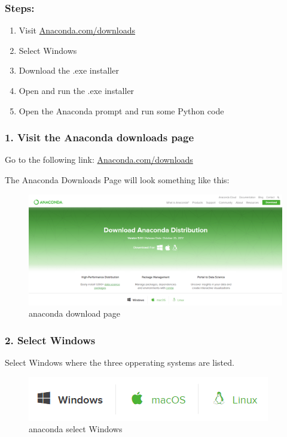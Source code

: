 \documentclass{book}
\makeatletter
\def\maxwidth{\ifdim\Gin@nat@width>\linewidth\linewidth
    \else\Gin@nat@width\fi}
\let\Oldincludegraphics\includegraphics
\renewcommand{\includegraphics}[1]{\Oldincludegraphics[width=.8\maxwidth]{#1}}
\makeatother
\begin{document}
\subsubsection{Steps:}\label{steps}

\begin{enumerate}
\def\labelenumi{\arabic{enumi}.}
\item
  Visit
  \href{https://www.anaconda.com/download/}{Anaconda.com/downloads}
\item
  Select Windows
\item
  Download the .exe installer
\item
  Open and run the .exe installer
\item
  Open the Anaconda prompt and run some Python code
\end{enumerate}

    \subsubsection{1. Visit the Anaconda downloads
page}\label{visit-the-anaconda-downloads-page}

Go to the following link:
\href{https://www.anaconda.com/download/}{Anaconda.com/downloads}

The Anaconda Downloads Page will look something like this:

\begin{figure}
\centering
\includegraphics{images/anaconda_download_page.png}
\caption{anaconda download page}
\end{figure}

    \subsubsection{2. Select Windows}\label{select-windows}

Select Windows where the three opperating systems are listed.

\begin{figure}
\centering
\includegraphics{images/anaconda_select_windows.png}
\caption{anaconda select Windows}
\end{figure}
\end{document}
